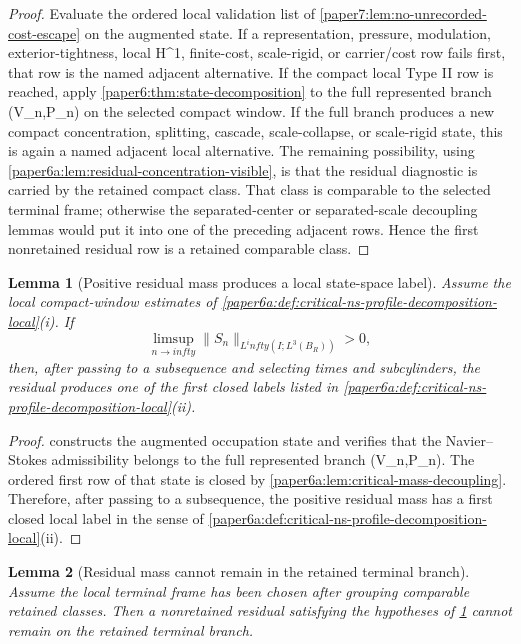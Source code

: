 \documentclass[11pt]{amsart}
\def\({}%
\def\){}%
\def\infty{infty}%
\theoremstyle{plain}
\newtheorem{lemma}[lemma]{Lemma}
\theoremstyle{definition}
\theoremstyle{remark}
\begin{document}
\begin{proof}
Evaluate the ordered local validation list of
\cref{paper7:lem:no-unrecorded-cost-escape} on the augmented state.  If a
representation, pressure, modulation, exterior-tightness, local \(H^1\),
finite-cost, scale-rigid, or carrier/cost row fails first, that row is the
named adjacent alternative.  If the compact local Type II row is reached, apply
\cref{paper6:thm:state-decomposition} to the full represented branch
\((V_n,P_n)\) on the selected compact window.  If the full branch produces a
new compact concentration, splitting, cascade, scale-collapse, or scale-rigid
state, this is again a named adjacent local alternative.  The remaining
possibility, using
\cref{paper6a:lem:residual-concentration-visible}, is that the residual
diagnostic is carried by the retained compact class.  That class is comparable
to the selected terminal frame; otherwise the separated-center or
separated-scale decoupling lemmas would put it into one of the preceding
adjacent rows.  Hence the first nonretained residual row is a retained
comparable class.
\end{proof}

\begin{lemma}[Positive residual mass produces a local state-space label]
\label{paper6a:lem:heat-flow-kato-smallness}
Assume the local compact-window estimates of
\cref{paper6a:def:critical-ns-profile-decomposition-local}\textup{(i)}.  If
\[
  \limsup_{n\to\infty}\|S_n\|_{L^\infty(I;L^3(B_R))}>0,
\]
then, after passing to a subsequence and selecting times and subcylinders, the
residual produces one of the first closed labels listed in
\cref{paper6a:def:critical-ns-profile-decomposition-local}\textup{(ii)}.
\end{lemma}

\begin{proof}
 constructs the augmented
occupation state and verifies that the Navier--Stokes admissibility belongs to
the full represented branch \((V_n,P_n)\).  The ordered first row of that state
is closed by \cref{paper6a:lem:critical-mass-decoupling}.  Therefore, after
passing to a subsequence, the positive residual mass has a first closed local
label in the sense of
\cref{paper6a:def:critical-ns-profile-decomposition-local}\textup{(ii)}.
\end{proof}

\begin{lemma}[Residual mass cannot remain in the retained terminal branch]
\label{paper6a:lem:nonlinear-profile-evolution-cited}
Assume the local terminal frame has been chosen after grouping comparable
retained classes.  Then a nonretained residual satisfying the hypotheses of
\cref{paper6a:lem:heat-flow-kato-smallness} cannot remain on the retained
terminal branch.
\end{lemma}
\end{document}
